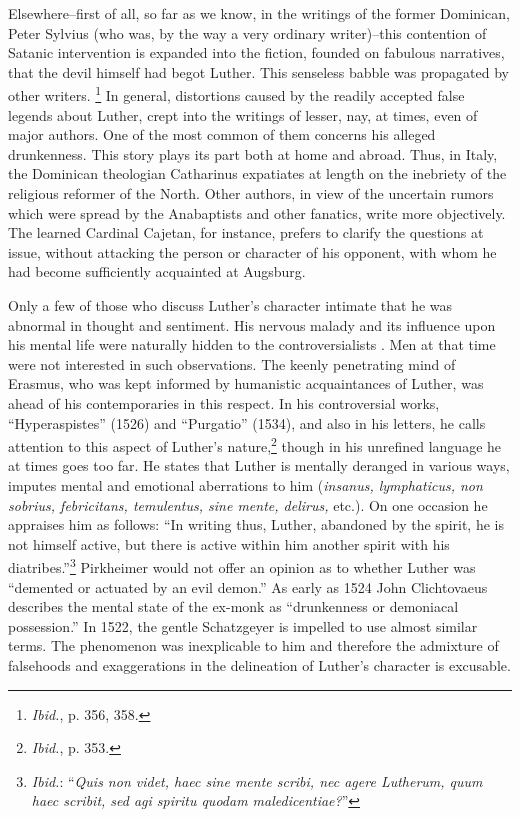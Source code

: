 Elsewhere--first of all, so far as we know, in the writings of the
former Dominican, Peter Sylvius (who was, by the way a very ordinary
writer)--this contention of Satanic intervention is expanded into
the fiction, founded on fabulous narratives, that the devil himself
had begot Luther. This senseless babble was propagated by other
writers.
\footnote{\textit{Ibid.}, p. 356, 358.}
In general, distortions caused by the readily accepted false
legends about Luther, crept into the writings of lesser, nay, at times,
even of major authors. One of the most common of them concerns
his alleged drunkenness. This story plays its part both at home and
abroad. Thus, in Italy, the Dominican theologian Catharinus expatiates
at length on the inebriety of the religious reformer of the
North. Other authors, in view of the uncertain rumors which were
spread by the Anabaptists and other fanatics, write more objectively. The
learned Cardinal Cajetan, for instance, prefers to clarify
the questions at issue, without attacking the person or character of
his opponent, with whom he had become sufficiently acquainted at
Augsburg.

Only a few of those who discuss Luther’s character intimate that he
was abnormal in thought and sentiment. His nervous malady and its
influence upon his mental life were naturally hidden to the controversialists
. Men at that time were not interested in such observations.
The keenly penetrating mind of Erasmus, who was kept informed
by humanistic acquaintances of Luther, was ahead of his contemporaries
in this respect. In his controversial works, “Hyperaspistes”
(1526) and “Purgatio” (1534), and also in his letters, he calls attention
to this aspect of Luther’s nature,\footnote{\textit{Ibid.}, p. 353.}
though in his unrefined language
he at times goes too far. He states that Luther is mentally deranged in
various ways, imputes mental and emotional aberrations to
him (\textit{insanus, lymphaticus, non sobrius, febricitans, temulentus, sine
mente, delirus,} etc.). On one occasion he appraises him as follows: “In
writing thus, Luther, abandoned by the spirit, he is not himself active,
but there is active within him another spirit with his diatribes.”\footnote
{\textit{Ibid.}: ``\textit{Quis non videt, haec sine mente scribi, nec agere Lutherum, quum haec scribit,
sed agi spiritu quodam maledicentiae?}''}
Pirkheimer would not offer an opinion as to whether Luther was “demented
or actuated by an evil demon.” As early as 1524 John Clichtovaeus
describes the mental state of the ex-monk as “drunkenness
or demoniacal possession.” In 1522, the gentle Schatzgeyer is impelled
to use almost similar terms. The phenomenon was inexplicable to him
and therefore the admixture of falsehoods and exaggerations in the
delineation of Luther’s character is excusable.


